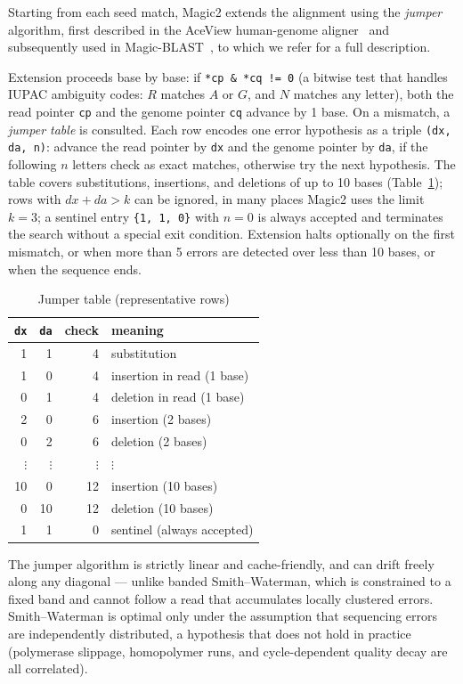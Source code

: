\documentclass[11pt]{article}
\begin{document}
Starting from each seed match, Magic2 extends the alignment using the
\emph{jumper} algorithm, first described in the AceView human-genome
aligner~\citep{aceview} and subsequently used in
Magic-BLAST~\citep{magicblast}, to which we refer for a full
description.

Extension proceeds base by base: if \texttt{*cp \& *cq != 0} (a
bitwise test that handles IUPAC ambiguity codes: $R$ matches $A$ or $G$, and $N$ matches any letter),
both the read pointer \texttt{cp} and the genome pointer \texttt{cq} advance by 1 base.
On a mismatch, a \emph{jumper table} is consulted.
Each row encodes one error hypothesis as a triple
\texttt{(dx, da, n)}: advance the read pointer by \texttt{dx} and the
genome pointer by \texttt{da}, if the following $n$ letters check as exact matches,
otherwise try the next hypothesis.
The table covers substitutions, insertions, and deletions of up to
10 bases (Table~\ref{tab:jumper});
rows with $dx+da >k$ can be ignored, in many places Magic2 uses the limit $k=3$;
a sentinel entry
\texttt{\{1,\,1,\,0\}} with $n=0$ is always accepted and terminates
the search without a special exit condition.
Extension halts optionally on the first mismatch, or
when more than 5 errors are detected over less than 10 bases,
or when the sequence ends.

\begin{table}[h]
\centering
\caption{Jumper table (representative rows)}
\label{tab:jumper}
\small
\begin{tabular}{rrrl}
\toprule
\texttt{dx} & \texttt{da} & check & meaning \\
\midrule
1 & 1 & 4 & substitution \\
1 & 0 & 4 & insertion in read (1 base) \\
0 & 1 & 4 & deletion in read (1 base) \\
2 & 0 & 6 & insertion (2 bases) \\
0 & 2 & 6 & deletion (2 bases) \\
$\vdots$ & $\vdots$ & $\vdots$ & $\vdots$ \\
10 & 0 & 12 & insertion (10 bases) \\
0 & 10 & 12 & deletion (10 bases) \\
1 & 1 & 0 & sentinel (always accepted) \\
\bottomrule
\end{tabular}
\end{table}


The jumper algorithm is strictly linear and cache-friendly, and can
drift freely along any diagonal --- unlike banded Smith--Waterman,
which is constrained to a fixed band and cannot follow a read that
accumulates locally clustered errors.
Smith--Waterman is optimal only under the assumption that sequencing
errors are independently distributed, a hypothesis that does not hold
in practice (polymerase slippage, homopolymer runs, and
cycle-dependent quality decay are all correlated).
\end{document}
